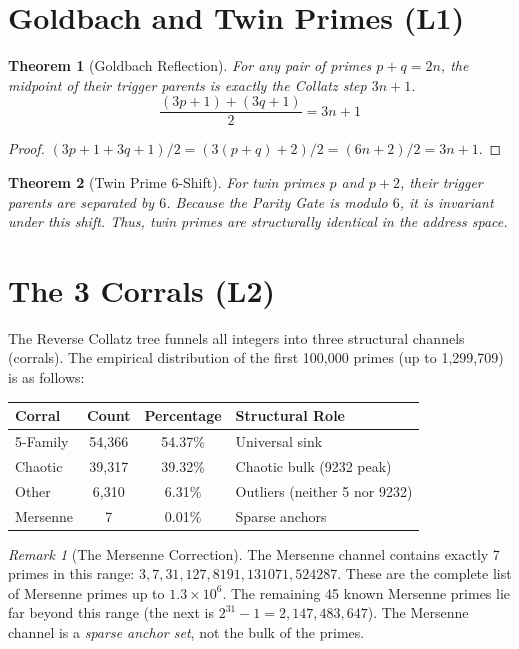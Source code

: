 \documentclass[11pt]{article}
\newtheorem{theorem}{Theorem}
\theoremstyle{definition}
\theoremstyle{remark}
\newtheorem{remark}{Remark}
\begin{document}
\section{Goldbach and Twin Primes (L1)}

\begin{theorem}[Goldbach Reflection]
For any pair of primes \(p + q = 2n\), the midpoint of their trigger parents is exactly the Collatz step \(3n+1\).
\[ \frac{(3p+1) + (3q+1)}{2} = 3n+1 \]
\end{theorem}

\begin{proof}
\((3p+1+3q+1)/2 = (3(p+q)+2)/2 = (6n+2)/2 = 3n+1\).
\end{proof}

\begin{theorem}[Twin Prime 6-Shift]
For twin primes \(p\) and \(p+2\), their trigger parents are separated by \(6\). Because the Parity Gate is modulo \(6\), it is invariant under this shift. Thus, twin primes are structurally identical in the address space.
\end{theorem}

\section{The 3 Corrals (L2)}

The Reverse Collatz tree funnels all integers into three structural channels (corrals). The empirical distribution of the first 100,000 primes (up to 1,299,709) is as follows:

\begin{center}
\begin{tabular}{l|c|c|l}
\toprule
\textbf{Corral} & \textbf{Count} & \textbf{Percentage} & \textbf{Structural Role} \\ \midrule
5-Family & 54,366 & 54.37\% & Universal sink \\
Chaotic & 39,317 & 39.32\% & Chaotic bulk (9232 peak) \\
Other & 6,310 & 6.31\% & Outliers (neither 5 nor 9232) \\
Mersenne & 7 & 0.01\% & Sparse anchors \\ \bottomrule
\end{tabular}
\end{center}

\begin{remark}[The Mersenne Correction]
The Mersenne channel contains exactly 7 primes in this range: \(3, 7, 31, 127, 8191, 131071, 524287\). These are the complete list of Mersenne primes up to \(1.3 \times 10^6\). The remaining 45 known Mersenne primes lie far beyond this range (the next is \(2^{31}-1 = 2,147,483,647\)). The Mersenne channel is a \emph{sparse anchor set}, not the bulk of the primes.
\end{remark}
\end{document}
